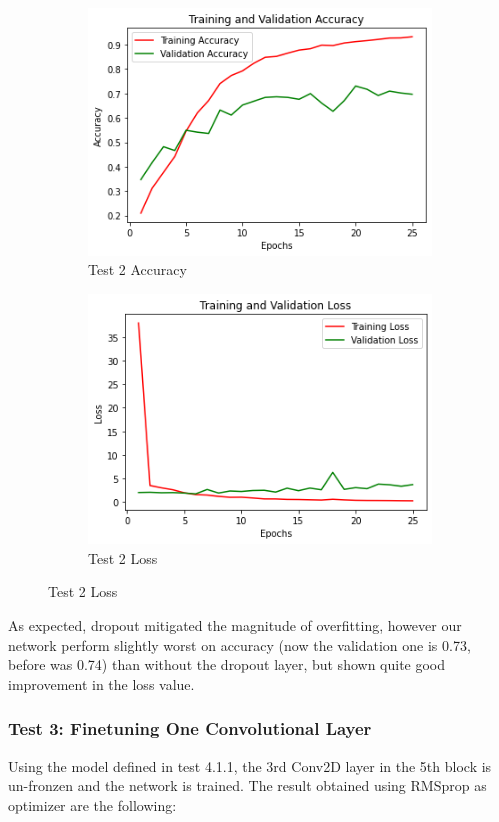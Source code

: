 \begin{figure}[H]
	\begin{subfigure}{0.5\textwidth}
		\includegraphics[width=0.9\linewidth]{img/vgg16/vgg16fe2acc.png} 
		\caption{Test 2 Accuracy}
		\label{fig:vgg16fe2acc}
	\end{subfigure}
	\begin{subfigure}{0.5\textwidth}
		\includegraphics[width=0.9\linewidth]{img/vgg16/vgg16fe2loss.png}
		\caption{Test 2 Loss}
		\label{fig:vgg16fe2oss}
	\end{subfigure}
\end{figure}

\noindent As expected, dropout mitigated the magnitude of overfitting, however our network perform slightly worst on accuracy (now the validation one is 0.73, before was 0.74) than without the dropout layer, but shown quite good improvement in the loss value.


\subsubsection{Test 3: Finetuning One Convolutional Layer}
Using the model defined in test 4.1.1, the 3rd Conv2D layer in the 5th block is un-fronzen and the network is trained. The result obtained using RMSprop as optimizer are the following:

